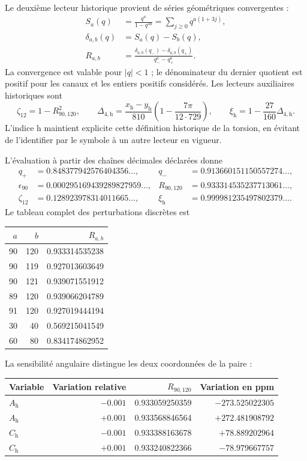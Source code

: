 Le deuxième lecteur historique provient de séries géométriques convergentes :
\begin{align*}
 S_a(q)&=\frac{q^a}{1-q^{3a}}
       =\sum_{j\geq0}q^{a(1+3j)},\\
 \delta_{a,b}(q)&=S_a(q)-S_b(q),\\
 R_{a,b}&=\frac{\delta_{a,b}(q_-)-\delta_{a,b}(q_+)}
 {q_-^a-q_+^a}.
\end{align*}
La convergence est valable pour $|q|<1$ ; le dénominateur du dernier quotient est
positif pour les canaux et les entiers positifs considérés. Les lecteurs
auxiliaires historiques sont
\[
 \zeta_{12}=1-R_{90,120}^2,\qquad
 \Delta_{4,\mathrm h}=\frac{x_{\mathrm h}-y_{\mathrm h}}{810}
 \left(1-\frac{7\pi}{12\cdot729}\right),\qquad
 \xi_{\mathrm h}=1-\frac{27}{160}\Delta_{4,\mathrm h}.
\]
L’indice $\mathrm h$ maintient explicite cette définition historique de la
torsion, en évitant de l’identifier par le symbole à un autre lecteur en vigueur.

L’évaluation à partir des chaînes décimales déclarées donne
\begin{align*}
 q_+&=0.848377942576404356\ldots,&
 q_-&=0.913660151150557274\ldots,\\
 \epsilon_{90}&=0.000295169439289827959\ldots,&
 R_{90,120}&=0.933314535237713061\ldots,\\
 \zeta_{12}&=0.128923978314011665\ldots,&
 \xi_{\mathrm h}&=0.999981235497802379\ldots.
\end{align*}
Le tableau complet des perturbations discrètes est
\begin{center}
\begin{tabular}{rrr}
\toprule
$a$&$b$&$R_{a,b}$\\\midrule
90&120&0.933314535238\\
90&119&0.927013603649\\
90&121&0.939071551912\\
89&120&0.939066204789\\
91&120&0.927019444194\\
30&40&0.569215041549\\
60&80&0.834174862952\\
\bottomrule
\end{tabular}
\end{center}
La sensibilité angulaire distingue les deux coordonnées de la paire :
\begin{center}
\begin{tabular}{lrrr}
\toprule
Variable&Variation relative&$R_{90,120}$&Variation en ppm\\\midrule
$A_{\mathrm h}$&$-0.001$&0.933059250359&$-273.525022305$\\
$A_{\mathrm h}$&$+0.001$&0.933568846564&$+272.481908792$\\
$C_{\mathrm h}$&$-0.001$&0.933388163678&$+78.889202964$\\
$C_{\mathrm h}$&$+0.001$&0.933240822366&$-78.979667757$\\
\bottomrule
\end{tabular}
\end{center}

